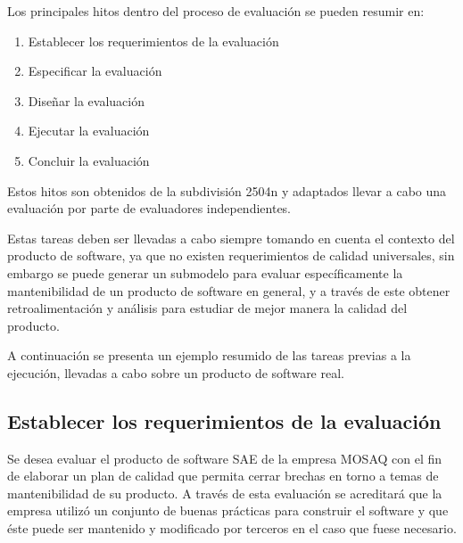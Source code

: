 \documentclass[letterpaper]{article}
\begin{document}
Los principales hitos dentro del proceso de evaluación se pueden resumir en:
\begin{enumerate}
    \item Establecer los requerimientos de la evaluación
    \item Especificar la evaluación
    \item Diseñar la evaluación
    \item Ejecutar la evaluación
    \item Concluir la evaluación
\end{enumerate}
Estos hitos son obtenidos de la subdivisión 2504n y adaptados llevar a cabo
una evaluación por parte de evaluadores independientes.

Estas tareas deben ser llevadas a cabo siempre tomando en cuenta el contexto
del producto de software, ya que no existen requerimientos de calidad universales,
sin embargo se puede generar un submodelo para evaluar específicamente la mantenibilidad
de un producto de software en general, y a través de este obtener retroalimentación
y análisis para estudiar de mejor manera la calidad del producto.

A continuación se presenta un ejemplo resumido de las tareas previas a la ejecución,
llevadas a cabo sobre un producto de software real.

\subsection{Establecer los requerimientos de la evaluación}

Se desea evaluar el producto de software SAE de la empresa MOSAQ con el fin de
elaborar un plan de calidad que permita cerrar brechas en torno a temas de 
mantenibilidad de su producto. A través de esta evaluación se acreditará que la 
empresa utilizó un conjunto de buenas prácticas para construir el software y que 
éste puede ser mantenido y modificado por terceros en el caso que fuese necesario.
\end{document}
